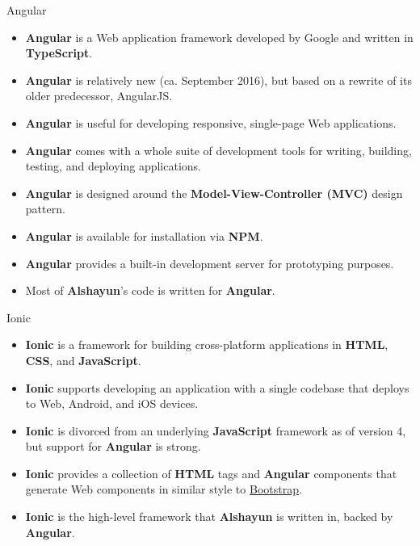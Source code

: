 \documentclass{beamer}
\begin{document}
\begin{frame}{Angular}
    \begin{itemize}
        \item \textbf{Angular} is a Web application framework developed by
            Google and written in \textbf{TypeScript}.
        \item \textbf{Angular} is relatively new (ca. September 2016), but based
            on a rewrite of its older predecessor, AngularJS.
        \item \textbf{Angular} is useful for developing responsive, single-page
            Web applications.
        \item \textbf{Angular} comes with a whole suite of development tools for
            writing, building, testing, and deploying applications.
        \item \textbf{Angular} is designed around the
            \textbf{Model-View-Controller (MVC)} design pattern.
        \item \textbf{Angular} is available for installation via \textbf{NPM}.
        \item \textbf{Angular} provides a built-in development server for
            prototyping purposes.
        \item Most of \textbf{Alshayun}'s code is written for \textbf{Angular}.
    \end{itemize}
\end{frame}

\begin{frame}{Ionic}
    \begin{itemize}
        \item \textbf{Ionic} is a framework for building cross-platform
            applications in \textbf{HTML}, \textbf{CSS}, and
            \textbf{JavaScript}.
        \item \textbf{Ionic} supports developing an application with a single
            codebase that deploys to Web, Android, and iOS devices.
        \item \textbf{Ionic} is divorced from an underlying \textbf{JavaScript}
            framework as of version 4, but support for \textbf{Angular} is
            strong.
        \item \textbf{Ionic} provides a collection of \textbf{HTML} tags and
            \textbf{Angular} components that generate Web components in similar
            style to \href{https://getbootstrap.com/}{Bootstrap}.
        \item \textbf{Ionic} is the high-level framework that \textbf{Alshayun}
            is written in, backed by \textbf{Angular}.
    \end{itemize}
\end{frame}
\end{document}

